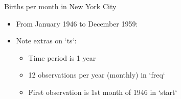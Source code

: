 \begin{frame}[fragile]{Births per month in New York City}
  \begin{itemize}
  \item From  January 1946 to December 1959:
\begin{knitrout}
\color{fgcolor}\begin{kframe}
\begin{alltt}
\hlkwb{=}\hlstd{(}\hlstd{,}
\hlkwb{=}\hlstd{=}\hlstd{,}\hlstd{=}\hlstd{(}\hlstd{,}\hlstd{))}
\end{alltt}
\end{kframe}
\end{knitrout}
\item Note extras on `ts`:
  \begin{itemize}
\item Time period is 1 year
\item 12 observations per year (monthly) in `freq`
\item First observation is 1st month of 1946 in `start`
  \end{itemize}
  \end{itemize}
\end{frame}


